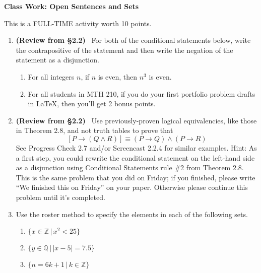 \documentclass[11pt]{article}
\begin{document}
	
	\thispagestyle{empty}
	\renewcommand{\headrulewidth}{0.0pt}
	\thispagestyle{fancy}
	\lfoot{}
	\cfoot{}
	\rfoot{}	
	
	\vspace*{0in}

		\begin{center}
			\begin{large}
			\textbf{Class Work: Open Sentences and Sets} \\
			\end{large}
		\end{center}
		
This is a FULL-TIME activity worth 10 points. 


\begin{enumerate}
	\item \textbf{(Review from \S2.2) }\ For both of the conditional statements below, write the contrapositive of the statement and then write the negation of the statement as a disjunction. 
	\begin{enumerate}
		\item For all integers $n$, if $n$ is even, then $n^3$ is even. 
		\item For all students in MTH 210, if you do your first portfolio problem drafts in \LaTeX, then you'll get 2 bonus points. 
	\end{enumerate}
	
	\item \textbf{(Review from \S2.2)} \ Use previously-proven logical equivalencies, like those in Theorem 2.8, and not truth tables to prove that 
	\[ [P \rightarrow (Q \wedge R) ] \equiv (P \rightarrow Q) \wedge (P \rightarrow R) \]
	See Progress Check 2.7 and/or Screencast 2.2.4 for similar examples. Hint: As a first step, you could rewrite the conditional statement on the left-hand side as a disjunction using Conditional Statements rule \#2 from Theorem 2.8. This is the same problem that you did on Friday; if you finished, please write ``We finished this on Friday'' on your paper. Otherwise please continue this problem until it's completed.
	
	
	\item Use the roster method to specify the elements in each of the following sets. 
	\begin{enumerate}
		\item $\{ x \in \mathbb{Z} \, | \, x^2 < 25 \}$
		\item $\{ y \in \mathbb{Q} \, | \, |x - 5| = 7.5 \}$
		\item $\{ n = 6k + 1 \, | \, k \in \mathbb{Z} \}$ 
	\end{enumerate}
	

\end{enumerate}
\end{document}
